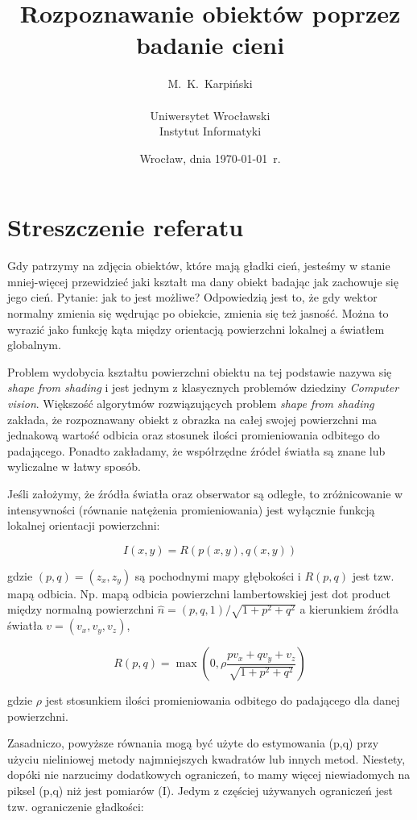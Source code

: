 \documentclass[a4paper,12pt]{article}
\title{Rozpoznawanie obiektów poprzez badanie cieni}
\author{M.~K.~Karpiński\\
\\
Uniwersytet Wrocławski\\
Instytut Informatyki}
\date{Wrocław, dnia \today\ r.}
\begin{document}
\maketitle

\section{Streszczenie referatu}
\indent \indent Gdy patrzymy na zdjęcia obiektów, które mają gładki cień, jesteśmy w stanie mniej-więcej przewidzieć jaki kształt ma dany obiekt badając jak zachowuje się jego cień. Pytanie: jak to jest możliwe? Odpowiedzią jest to, że gdy wektor normalny zmienia się wędrując po obiekcie, zmienia się też jasność. Można to wyrazić jako funkcję kąta między orientacją powierzchni lokalnej a światłem globalnym.

Problem wydobycia kształtu powierzchni obiektu na tej podstawie nazywa się {\em shape from shading} i jest jednym z klasycznych problemów dziedziny {\em Computer vision}. Większość algorytmów rozwiązujących problem {\em shape from shading} zakłada, że rozpoznawany obiekt z obrazka na całej swojej powierzchni ma jednakową wartość odbicia oraz stosunek ilości promieniowania odbitego do padającego. Ponadto zakładamy, że współrzędne źródeł światła są znane lub wyliczalne w łatwy sposób.

Jeśli założymy, że źródła światła oraz obserwator są odległe, to zróżnicowanie w intensywności (równanie natężenia promieniowania) jest wyłącznie funkcją lokalnej orientacji powierzchni:

\begin{equation}
I(x,y) = R(p(x,y),q(x,y))
\end{equation}

\noindent gdzie $(p,q)=(z_x,z_y)$ są pochodnymi mapy głębokości i $R(p,q)$ jest tzw. mapą odbicia. Np. mapą odbicia powierzchni lambertowskiej jest dot product między normalną powierzchni $\hat{n}=(p,q,1)/\sqrt{1 + p^2 + q^2}$ a kierunkiem źródła światła $v= (v_x,v_y,v_z)$,

\begin{equation}
R(p,q) = \max(0,\rho \frac{pv_x + qv_y + v_z}{\sqrt{1 + p^2 + q^2}})
\end{equation}

\noindent gdzie $\rho$ jest stosunkiem ilości promieniowania odbitego do padającego dla danej powierzchni.

Zasadniczo, powyższe równania mogą być użyte do estymowania (p,q) przy użyciu nieliniowej metody najmniejszych kwadratów lub innych metod. Niestety, dopóki nie narzucimy dodatkowych ograniczeń, to mamy więcej niewiadomych na piksel (p,q) niż jest pomiarów (I). Jedym z częściej używanych ograniczeń jest tzw. ograniczenie gładkości:
\end{document}
